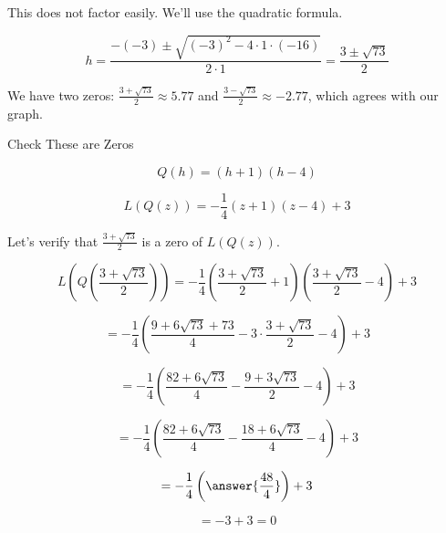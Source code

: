 \documentclass{ximera}
\begin{document}
This does not factor easily.  We'll use the quadratic formula.


\[  h = \frac{-(-3) \pm \sqrt{(-3)^2 - 4 \cdot 1 \cdot (-16)}}{2 \cdot 1}  = \frac{3 \pm \sqrt{73}}{2}     \]


We have two zeros: $\frac{3 + \sqrt{73}}{2}  \approx 5.77$ and $\frac{3 - \sqrt{73}}{2} \approx -2.77$, which agrees with our graph.



\begin{claim} Check These are Zeros


\[   Q(h) = (h+1)(h-4)   \]


\[   L(Q(z)) = -\frac{1}{4} (z+1)(z-4) + 3   \]


Let's verify that $\frac{3 + \sqrt{73}}{2}$ is a zero of $L(Q(z))$.



\[   L \left( Q \left( \frac{3 + \sqrt{73}}{2} \right) \right) = -\frac{1}{4} \left( \frac{3 + \sqrt{73}}{2}+1 \right) \left( \frac{3 + \sqrt{73}}{2}-4 \right) + 3    \]



\[  = -\frac{1}{4} \left( \frac{9 + 6 \sqrt{73} + 73}{4} - 3 \cdot \frac{3 + \sqrt{73}}{2} - 4 \right) + 3    \]


\[  = -\frac{1}{4} \left( \frac{82 + 6 \sqrt{73}}{4} - \frac{9 + 3 \sqrt{73}}{2} - 4 \right) + 3    \]


\[  = -\frac{1}{4} \left( \frac{82 + 6 \sqrt{73}}{4} - \frac{18 + 6 \sqrt{73}}{4} - 4 \right) + 3    \]


\[  = -\frac{1}{4} \left( \answer{\frac{48}{4}} \right) + 3    \]


\[  = -3 + 3   = 0 \]


\end{claim}
\end{document}
